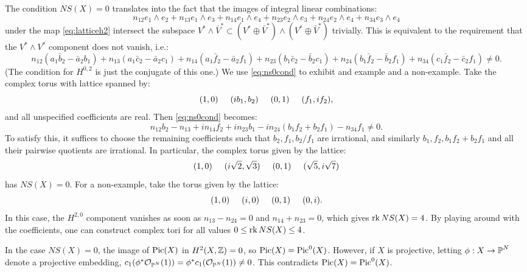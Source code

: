 \documentclass{article}
\begin{document}
The condition $NS(X) = 0$ translates into the fact that the images of integral linear combinations:
\[	n_{12} e_1 \wedge e_2 + n_{13} e_1 \wedge e_3 + n_{14} e_1 \wedge e_4 + n_{23} e_2 \wedge e_3 +
n_{24} e_2 \wedge e_4 + n_{34} e_3 \wedge e_4	\]
under the map \ref{eq:latticeh2} intersect the subspace $V^* \wedge \bar V^* \subset (V^* \oplus \bar V^*) \wedge
(V^* \oplus \bar V^*)$ trivially. This is equivalent to the requirement that the $V^* \wedge V^*$ component does not
vanish, i.e.:
\begin{equation}
\label{eq:ns0cond}
	n_{12} (a_1 \bar b_2 - \bar a_2 b_1) + n_{13} (a_1 \bar c_2 - \bar a_2 c_1) + n_{14} (a_1 \bar f_2 - \bar a_2 f_1)
 + n_{23} (b_1 \bar c_2 - \bar b_2 c_1) +
n_{24} (b_1 \bar f_2 - \bar b_2 f_1) + n_{34} (c_1 \bar f_2 - \bar c_2 f_1) \neq 0.
\end{equation}
(The condition for $H^{0,2}$ is just the conjugate of this one.) We use \ref{eq:ns0cond} to exhibit and example and a non-example.
Take the complex torus with lattice spanned by:
\[	(1,0) \hspace{5mm} (i b_1, b_2) \hspace{5mm} (0,1) \hspace{5mm} (f_1,i f_2),	\]
and all unspecified coefficients are real. Then \ref{eq:ns0cond} becomes:
\[	n_{12} b_2 - n_{13} + i n_{14} f_2 + i n_{23} b_1 - i n_{24} (b_1 f_2 + b_2 f_1) - n_{34} f_1 \neq 0.	\]
To satisfy this, it suffices to choose the remaining coefficients such that $b_2, f_1, b_2/f_1$ are irrational, and
similarly $b_1, f_2, b_1f_2 + b_2f_1$ and all their pairwise quotients are irrational. In particular, the complex torus
given by the lattice:
\[	(1,0) \hspace{5mm} (i \sqrt{2}, \sqrt{3}) \hspace{5mm} (0,1) \hspace{5mm} (\sqrt{5},i \sqrt{7})	\]
has $NS(X) = 0$. For a non-example, take the torus given by the lattice:
\[	(1,0) \hspace{5mm} (i, 0) \hspace{5mm} (0,1) \hspace{5mm} (0,i). \]
In this case, the $H^{2,0}$ component vanishes as soon as $n_{13} - n_{24}= 0$ and $n_{14} + n_{23} = 0$, which gives
$\operatorname{rk} NS(X) = 4$. By playing around with the coefficients, one can construct complex tori for all values $0 \leq \operatorname{rk} NS(X)
\leq 4$.

In the case $NS(X) = 0$, the image of $\operatorname{Pic}(X)$ in $H^2(X,\mathbb{Z}) = 0$, so $\operatorname{Pic}(X) = \operatorname{Pic}^0(X)$. However, if $X$ is projective,
letting $\phi : X \to \operatorname{\mathbb{P}}^N$ denote a projective embedding, $c_1(\phi^*\mathcal{O}_{\operatorname{\mathbb{P}}^N}(1)) = \phi^* c_1(
\mathcal{O}_{\operatorname{\mathbb{P}}^N}(1)) \neq 0$.  This contradicts $\operatorname{Pic}(X) = \operatorname{Pic}^0(X)$.
\end{document}
